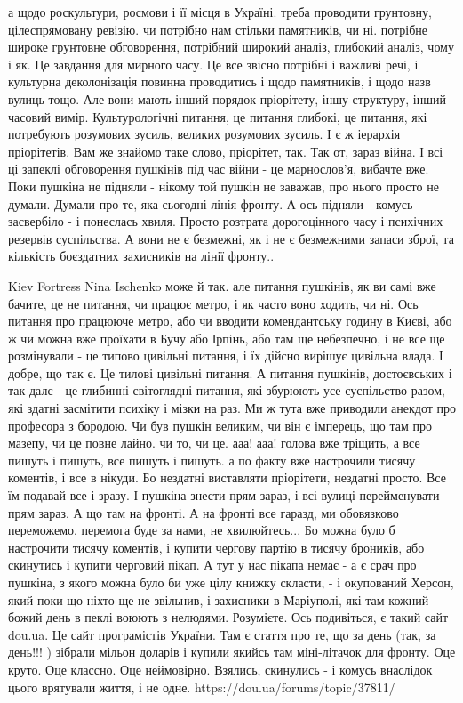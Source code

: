 а щодо роскультури, росмови і її місця в Україні. треба проводити грунтовну,
цілеспрямовану ревізію. чи потрібно нам стільки памятників, чи ні. потрібне
широке грунтовне обговорення, потрібний широкий аналіз, глибокий аналіз, чому і
як. Це завдання для мирного часу. Це все звісно потрібні і важливі речі, і
культурна деколонізація повинна проводитись і щодо памятників, і щодо назв
вулиць тощо. Але вони мають інший порядок пріорітету, іншу структуру, інший
часовий вимір. Культурологічні питання, це питання глибокі, це питання, які
потребують розумових зусиль, великих розумових зусиль. І є ж іерархія
пріорітетів. Вам же знайомо таке слово, пріорітет, так. Так от, зараз війна. І
всі ці запеклі обговорення пушкінів під час війни - це марнослов'я, вибачте
вже. Поки пушкіна не підняли - нікому той пушкін не заважав, про нього просто
не думали. Думали про те, яка сьогодні лінія фронту. А ось підняли - комусь
засвербіло - і понеслась хвиля. Просто розтрата дорогоцінного часу і психічних
резервів суспільства. А вони не є безмежні, як і не є безмежними запаси зброї,
та кількість боєздатних захисників на лінії фронту..

Kiev Fortress Nina Ischenko може й так. але питання пушкінів, як ви самі вже
бачите, це не питання, чи працює метро, і як часто воно ходить, чи ні. Ось
питання про працююче метро, або чи вводити комендантську годину в Києві, або ж
чи можна вже проїхати в Бучу або Ірпінь, або там ще небезпечно, і не все ще
розмінували - це типово цивільні питання, і їх дійсно вирішує цивільна влада. І
добре, що так є. Це тилові цивільні питання. А питання пушкінів, достоєвських і
так далє - це глибинні світоглядні питання, які збурюють усе суспільство разом,
які здатні засмітити психіку і мізки на раз. Ми ж тута вже приводили анекдот
про професора з бородою. Чи був пушкін великим, чи він є імперець, що там про
мазепу, чи це повне лайно. чи то, чи це. ааа! ааа! голова вже тріщить, а все
пишуть і пишуть, все пишуть і пишуть. а по факту вже настрочили тисячу
коментів, і все в нікуди. Бо нездатні виставляти пріорітети, нездатні просто.
Все їм подавай все і зразу. І пушкіна знести прям зараз, і всі вулиці
перейменувати прям зараз. А що там на фронті. А на фронті все гаразд, ми
обовязково переможемо, перемога буде за нами, не хвилюйтесь... Бо можна було б
настрочити тисячу коментів, і купити чергову партію в тисячу броників, або
скинутись і купити черговий пікап. А тут у нас пікапа немає - а є срач про
пушкіна, з якого можна було би уже цілу книжку скласти, - і окупований Херсон,
який поки що ніхто ще не звільнив, і захисники в Маріуполі, які там кожний
божий день в пеклі воюють з нелюдями. Розумієте. Ось подивіться, є такий сайт
dou.ua. Це сайт програмістів України. Там є стаття про те, що за день (так, за
день!!! ) зібрали мільон доларів і купили якийсь там міні-літачок для фронту.
Оце круто. Оце классно. Оце неймовірно. Взялись, скинулись - і комусь внаслідок
цього врятували життя, і не одне. https://dou.ua/forums/topic/37811/

